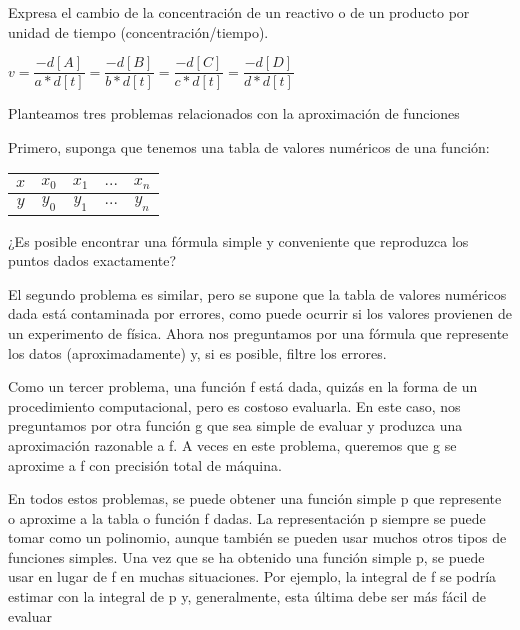 \documentclass[10pt,a4paper]{article}
\begin{document}
\begin{multicols}{2}

\noindent Expresa el cambio de la concentración de un reactivo o de un producto por unidad de tiempo (concentración/tiempo).\\

\begin{center}
	{\scriptsize
		$v = \dfrac{-d[A]}{a*d[t]} = \dfrac{-d[B]}{b*d[t]} = \dfrac{-d[C]}{c*d[t]} = \dfrac{-d[D]}{d*d[t]}$ \\ 
				
	}
\end{center}

\vspace*{0.4cm}


\noindent Planteamos tres problemas relacionados con la aproximación de funciones

Primero, suponga que tenemos una tabla de valores numéricos de una función:

\begin{center}
	\begin{tabular}{ c|c|c|c|c }
		
		$x$ & $x_0$ & $x_1$ & $...$ & $x_n$ \\ \hline
		$y$ & $y_0$ & $y_1$ & $...$ & $y_n$
	\end{tabular}
\end{center}

¿Es posible encontrar una fórmula simple y conveniente que reproduzca los puntos dados exactamente?

El segundo problema es similar, pero se supone que la tabla de valores numéricos dada está contaminada por errores, como puede ocurrir si los valores provienen de un experimento de física. Ahora nos preguntamos por una fórmula que represente los datos (aproximadamente) y, si es posible, filtre los errores.

Como un tercer problema, una función f está dada, quizás en la forma de un procedimiento computacional, pero es costoso evaluarla. En este caso, nos preguntamos por otra función g que sea simple de evaluar y produzca una aproximación razonable a f. A veces en este problema, queremos que g se aproxime a f con precisión total de máquina.

En todos estos problemas, se puede obtener una función simple p que represente o aproxime a la tabla o función f dadas. La representación p siempre se puede tomar como un polinomio, aunque también se pueden usar muchos otros tipos de funciones simples. Una vez que se ha obtenido una función simple p, se puede usar en lugar de f en muchas situaciones. Por ejemplo, la integral de f se podría estimar con la integral de p y, generalmente, esta última debe ser más fácil de evaluar


\end{multicols}
\end{document}
